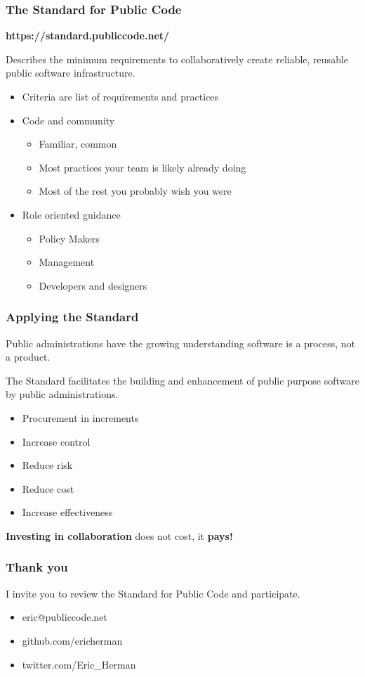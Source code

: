 \documentclass{beamer}
\begin{document}
\begin{frame}
\frametitle{The Standard for Public Code}

\textbf{https://standard.publiccode.net/}\newline

Describes the minimum requirements to collaboratively create reliable, reusable
public software infrastructure.\newline

\begin{itemize}
\item Criteria are list of requirements and practices
\item Code and community
\begin{itemize}
\item Familiar, common
\item Most practices your team is likely already doing
\item Most of the rest you probably wish you were
\end{itemize}
\item Role oriented guidance
\begin{itemize}
\item Policy Makers
\item Management
\item Developers and designers
\end{itemize}
\end{itemize}
\end{frame}

\begin{frame}
\frametitle{Applying the Standard}
Public administrations have the growing understanding software is a process,
not a product.\newline

The Standard facilitates the building and enhancement of public
purpose software by public administrations.\newline

\begin{itemize}
\item Procurement in increments
\item Increase control
\item Reduce risk
\item Reduce cost
\item Increase effectiveness\newline
\end{itemize}
\textbf{Investing in collaboration} does not cost, it \textbf{pays!}
\end{frame}

\begin{frame}
\frametitle{Thank you}
I invite you to review the Standard for Public Code and participate.\newline
\begin{itemize}
\item eric@publiccode.net
\item github.com/ericherman
\item twitter.com/Eric\_Herman
\end{itemize}
\end{frame}
\end{document}

